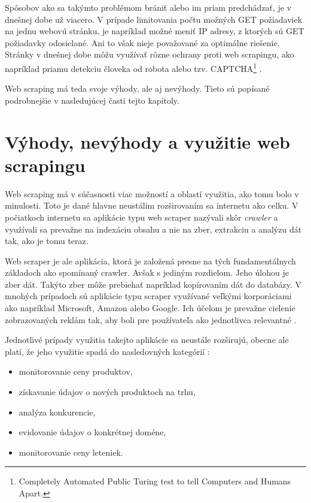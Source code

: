 Spôsobov ako sa takýmto problémom brániť alebo im priam predchádzať, je v dnešnej dobe už viacero. V prípade limitovania počtu možných GET požiadaviek na jednu webovú stránku, je napríklad možné meniť IP adresy, z ktorých sú GET požiadavky odosielané. Ani to však nieje považované za optimálne riešenie. Stránky v dnešnej dobe môžu využívať rôzne ochrany proti web scrapingu, ako napríklad priamu detekciu človeka od robota alebo tzv. CAPTCHA\footnote{Completely Automated Public Turing test to tell Computers and Humans Apart.} \cite{JanCurna:online}.

Web scraping má teda svoje výhody, ale aj nevýhody. Tieto sú popísané podrobnejšie v nasledujúcej časti tejto kapitoly.

\section{Výhody, nevýhody a využitie web scrapingu}

Web scraping má v súčasnosti viac možností a oblastí využitia, ako tomu bolo v minulosti. Toto je dané hlavne neustálim rozširovaním sa internetu ako celku. V počiatkoch internetu sa aplikácie typu web scraper nazývali skôr \textit{crawler} a využívali sa prevažne na indexáciu obsahu a nie na zber, extrakciu a analýzu dát tak, ako je tomu teraz. 

Web scraper je ale aplikácia, ktorá je založená presne na tých fundamentálnych základoch ako spomínaný crawler. Avšak s jediným rozdielom. Jeho úlohou je zber dát. Takýto zber môže prebiehať napríklad kopírovaním dát do databázy. V mnohých prípadoch sú aplikácie typu scraper využívané veľkými korporáciami ako napríklad Microsoft, Amazon alebo Google. Ich účelom je prevažne cielenie zobrazovaných reklám tak, aby boli pre používateľa ako jednotlivca relevantné \cite{online:how_does_scraping_work}.

\bigskip

Jednotlivé prípady využitia takejto aplikácie sa neustále rozširujú, obecne ale platí, že jeho využitie spadá do nasledovných kategórií \cite{WebScrap}:

\begin{itemize}
    \item monitorovanie ceny produktov,
    \item získavanie údajov o nových produktoch na trhu,
    \item analýza konkurencie,
    \item evidovanie údajov o konkrétnej doméne,
    \item monitorovanie ceny leteniek.
\end{itemize}

